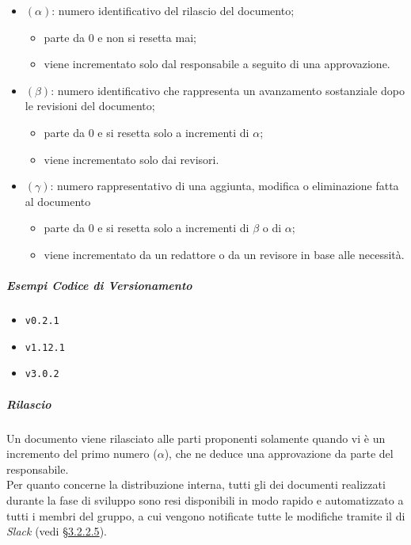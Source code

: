 		\begin{itemize}
			\item \((\alpha)\): numero identificativo del rilascio del documento;
			\begin{itemize}
				\item parte da 0 e non si resetta mai;
				\item viene incrementato solo dal responsabile a seguito di una approvazione.
			\end{itemize}
			\item \((\beta)\): numero identificativo che rappresenta un avanzamento sostanziale dopo le revisioni del documento;
			\begin{itemize}
				\item parte da 0 e si resetta solo a incrementi di \(\alpha\);
				\item viene incrementato solo dai revisori.
			\end{itemize}
			\item \((\gamma)\): numero rappresentativo di una aggiunta, modifica o eliminazione fatta al documento
			\begin{itemize}
				\item parte da 0 e si resetta solo a incrementi di \(\beta\) o di \(\alpha\);
				\item viene incrementato da un redattore o da un revisore in base alle necessità. 
			\end{itemize}
		\end{itemize}

		\subparagraph{Esempi Codice di Versionamento} 
		
		\begin{itemize}
			\item \verb!v0.2.1!
			\item \verb!v1.12.1!
			\item \verb!v3.0.2!
		\end{itemize}

		\subparagraph{Rilascio}

		Un documento viene rilasciato alle parti proponenti solamente quando vi è un incremento del primo numero (\(\alpha\)), che ne deduce una approvazione da parte del responsabile. \\ 
		Per quanto concerne la distribuzione interna, tutti gli  dei documenti realizzati durante la fase di sviluppo sono resi disponibili in modo rapido e automatizzato a tutti i membri del gruppo, a cui vengono notificate tutte le modifiche tramite il  di \textit{Slack} (vedi \hyperref[sec:cd_docs]{\S 3.2.2.5}).

